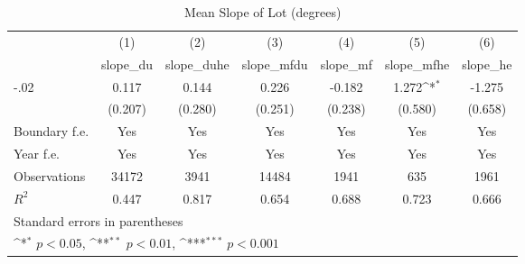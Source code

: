 \begin{table}[htbp]\centering
\def\sym#1{\ifmmode^{#1}\else\(^{#1}\)\fi}
\caption{Mean Slope of Lot (degrees)}
\begin{tabular}{l*{6}{c}}
\hline\hline
                    &\multicolumn{1}{c}{(1)}&\multicolumn{1}{c}{(2)}&\multicolumn{1}{c}{(3)}&\multicolumn{1}{c}{(4)}&\multicolumn{1}{c}{(5)}&\multicolumn{1}{c}{(6)}\\
                    &\multicolumn{1}{c}{slope\_du}&\multicolumn{1}{c}{slope\_duhe}&\multicolumn{1}{c}{slope\_mfdu}&\multicolumn{1}{c}{slope\_mf}&\multicolumn{1}{c}{slope\_mfhe}&\multicolumn{1}{c}{slope\_he}\\
\hline
-.02                &       0.117         &       0.144         &       0.226         &      -0.182         &       1.272\sym{*}  &      -1.275         \\
                    &     (0.207)         &     (0.280)         &     (0.251)         &     (0.238)         &     (0.580)         &     (0.658)         \\
[1em]
Boundary f.e.       &         Yes         &         Yes         &         Yes         &         Yes         &         Yes         &         Yes         \\
[1em]
Year f.e.           &         Yes         &         Yes         &         Yes         &         Yes         &         Yes         &         Yes         \\
\hline
Observations        &       34172         &        3941         &       14484         &        1941         &         635         &        1961         \\
\(R^{2}\)           &       0.447         &       0.817         &       0.654         &       0.688         &       0.723         &       0.666         \\
\hline\hline
\multicolumn{7}{l}{\footnotesize Standard errors in parentheses}\\
\multicolumn{7}{l}{\footnotesize \sym{*} \(p<0.05\), \sym{**} \(p<0.01\), \sym{***} \(p<0.001\)}\\
\end{tabular}
\end{table}
